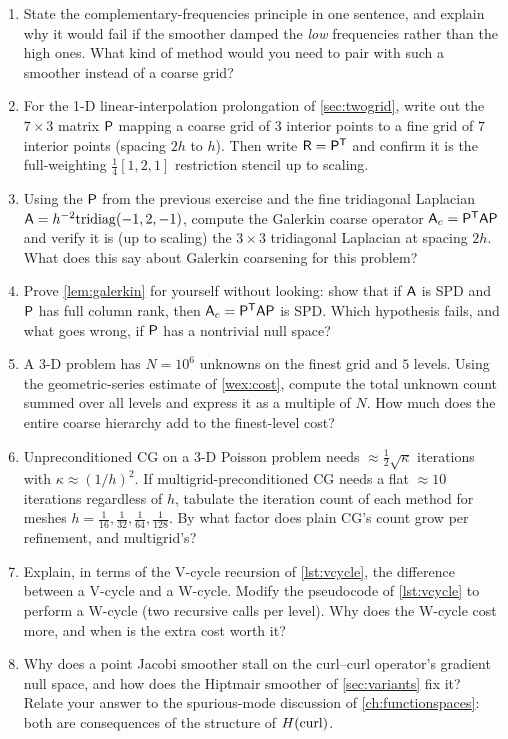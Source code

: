 \exercisessection
\begin{enumerate}[nosep]
\item State the complementary-frequencies principle in one sentence, and explain why it would
  fail if the smoother damped the \emph{low} frequencies rather than the high ones. What kind of
  method would you need to pair with such a smoother instead of a coarse grid?
\item For the 1-D linear-interpolation prolongation of \cref{sec:twogrid}, write out the
  $7\times 3$ matrix $\mathsf{P}$ mapping a coarse grid of $3$ interior points to a fine grid of $7$
  interior points (spacing $2h$ to $h$). Then write $\mathsf{R}=\mathsf{P}^{\mathsf T}$ and confirm it
  is the full-weighting $\tfrac14[1,2,1]$ restriction stencil up to scaling.
\item Using the $\mathsf{P}$ from the previous exercise and the fine tridiagonal Laplacian
  $\mathsf{A}=h^{-2}\mathrm{tridiag}(-1,2,-1)$, compute the Galerkin coarse operator
  $\mathsf{A}_c=\mathsf{P}^{\mathsf T}\mathsf{A}\mathsf{P}$ and verify it is (up to scaling) the $3\times 3$
  tridiagonal Laplacian at spacing $2h$. What does this say about Galerkin coarsening for this
  problem?
\item Prove \cref{lem:galerkin} for yourself without looking: show that if $\mathsf{A}$ is SPD and
  $\mathsf{P}$ has full column rank, then $\mathsf{A}_c=\mathsf{P}^{\mathsf T}\mathsf{A}\mathsf{P}$ is SPD. Which
  hypothesis fails, and what goes wrong, if $\mathsf{P}$ has a nontrivial null space?
\item A 3-D problem has $N = 10^6$ unknowns on the finest grid and $5$ levels. Using the
  geometric-series estimate of \cref{wex:cost}, compute the total unknown count summed over all
  levels and express it as a multiple of $N$. How much does the entire coarse hierarchy add to the
  finest-level cost?
\item Unpreconditioned CG on a 3-D Poisson problem needs $\approx\tfrac12\sqrt{\kappa}$ iterations
  with $\kappa\approx (1/h)^2$. If multigrid-preconditioned CG needs a flat $\approx 10$ iterations
  regardless of $h$, tabulate the iteration count of each method for meshes
  $h=\tfrac1{16},\tfrac1{32},\tfrac1{64},\tfrac1{128}$. By what factor does plain CG's count grow
  per refinement, and multigrid's?
\item Explain, in terms of the V-cycle recursion of \cref{lst:vcycle}, the difference between a
  V-cycle and a W-cycle. Modify the pseudocode of \cref{lst:vcycle} to perform a W-cycle (two
  recursive calls per level). Why does the W-cycle cost more, and when is the extra cost worth it?
\item Why does a point Jacobi smoother stall on the curl--curl operator's gradient null space, and
  how does the Hiptmair smoother of \cref{sec:variants} fix it? Relate your answer to the
  spurious-mode discussion of \cref{ch:functionspaces}: both are consequences of the structure of
  $H(\mathrm{curl})$.
\end{enumerate}

